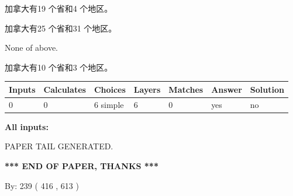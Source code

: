 \documentclass{ctexart}
\begin{document}
 
加拿大有19 个省和4 个地区。
 
 
加拿大有25 个省和31 个地区。
 
 
 None of above.
 
 
\noindent{}
 
 
加拿大有10 个省和3 个地区。
 
 
\noindent{}
 
 
   
   
   
   
\noindent\begin{tabular}{|l|l|l|l|l|l|l|}
 \hline
Inputs & Calculates & Choices & Layers & Matches & Answer & Solution \\ \hline
 0  & 
 0  & 
 6
  simple  
  & 
 6  & 
 0  & 
  yes & 
  no 
  \\ \hline
 \end{tabular}
   
   
   
   
\noindent{}
   
   
   
   
\noindent\vspace{0.1in}\hspace{-0.08in} {\textbf{\Large{All inputs: }}}
   
   
   
   
   
   
 \vspace{0.2in}
 
   
   
\vspace{2.0in} PAPER TAIL GENERATED.
   
   
   
   
\vspace{1.0in} 
{\textbf{\large{ *** END OF PAPER, THANKS *** }}} 
   
   
\hspace{1.0in} By: 
 239 ( 416 ,  613 )
   
   
   
   
\newpage 
\setcounter{page}{ 
   548001 } 
   
   
   
\end{document}
